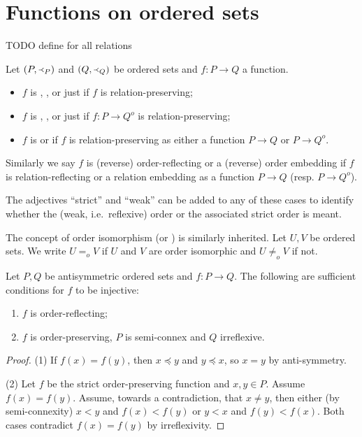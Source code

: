 \section{Functions on ordered sets}
TODO define for all relations
\begin{definition}
Let $(P, \Yleft_P)$ and $(Q, \Yleft_Q)$ be ordered sets and $f: P\to Q$ a function.
\begin{itemize}
\item $f$ is , ,  or just  if $f$ is relation-preserving;
\item $f$ is , ,  or just  if $f: P\to Q^o$ is relation-preserving;
\item $f$ is  or  if $f$ is relation-preserving as either a function $P\to Q$ or $P\to Q^o$.
\end{itemize}
Similarly we say $f$ is (reverse) order-reflecting or a (reverse) order embedding if $f$ is relation-reflecting or a relation embedding as a function $P\to Q$ (resp. $P\to Q^o$).

The adjectives ``strict'' and ``weak'' can be added to any of these cases to identify whether the (weak, i.e.\ reflexive) order or the associated strict order is meant.
\end{definition}
The concept of order isomorphism (or ) is similarly inherited. Let $U,V$ be ordered sets. We write $U =_o V$ if $U$ and $V$ are order isomorphic and $U \neq_o V$ if not.

\begin{lemma} \label{antisymmetricOrderPreservationInjective}
Let $P,Q$ be antisymmetric ordered sets and $f: P\to Q$. The following are sufficient conditions for $f$ to be injective:
\begin{enumerate}
\item $f$ is order-reflecting;
\item $f$ is order-preserving, $P$ is semi-connex and $Q$ irreflexive.
\end{enumerate}
\end{lemma}
\begin{proof}
(1) If $f(x) = f(y)$, then $x\preceq y$ and $y\preceq x$, so $x=y$ by anti-symmetry.

(2) Let $f$ be the strict order-preserving function and $x,y\in P$. Assume $f(x)=f(y)$. Assume, towards a contradiction, that $x\neq y$, then either (by semi-connexity) $x<y$ and $f(x) < f(y)$ or $y < x$ and $f(y)<f(x)$. Both cases contradict $f(x)=f(y)$ by irreflexivity.
\end{proof}

